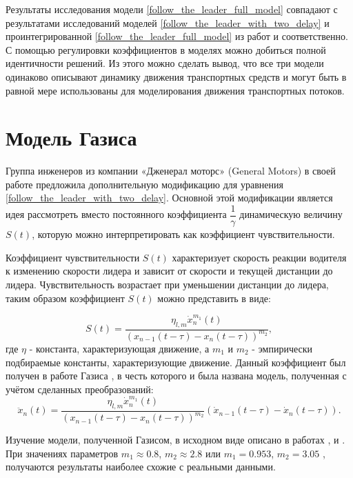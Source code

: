 \documentclass[12pt, a4paper]{extarticle}
\numberwithin{equation}{section}
\begin{document}
Результаты исследования модели \eqref{follow_the_leader_full_model} совпадают с  результатами исследований моделей \eqref{follow_the_leader_with_two_delay} и проинтегрированной \eqref{follow_the_leader_full_model} из работ \cite{RefineFirstFollowTheLeaderModel} и \cite{Course} соответственно. С помощью регулировки коэффициентов в моделях можно добиться полной идентичности решений. Из этого можно сделать вывод, что все три модели одинаково описывают динамику движения транспортных средств и могут быть в равной мере использованы для моделирования движения транспортных потоков.

\section{Модель Газиса}

Группа инженеров из компании «Дженерал моторс» (General Motors) в своей работе \cite{GazisModel} предложила дополнительную модификацию для уравнения  \eqref{follow_the_leader_with_two_delay}. Основной этой модификации является идея рассмотреть вместо постоянного коэффициента $\dfrac{1}{\gamma}$ динамическую величину $S(t)$, которую можно интерпретировать как коэффициент чувствительности. 

Коэффициент чувствительности $S(t)$ характеризует скорость реакции водителя к изменению скорости лидера и зависит от скорости и текущей дистанции до лидера. Чувствительность возрастает при уменьшении дистанции до лидера, таким образом коэффициент $S(t)$ можно представить в виде:

\begin{equation} \label{gazis_coefficient}
S(t) = \dfrac{\eta_{l,m}\dot{x}_n^{m_1}(t)}{(x_{n-1}(t-\tau)-x_n(t-\tau))^{m_2}},
\end{equation}
где $\eta$ - константа, характеризующая движение, а $m_1$ и $m_2$ - эмпирически подбираемые константы, характеризующие движение. Данный коэффициент был получен в работе Газиса \cite{GazisModel}, в честь которого и была названа модель, полученная с учётом сделанных преобразований:   
\begin{equation} \label{gazis_model}
\ddot{x}_n(t) = \dfrac{\eta_{l,m}\dot{x}_n^{m_1}(t)}{(x_{n-1}(t-\tau)-x_n(t-\tau))^{m_2}} (\dot{x}_{n-1}(t-\tau) - \dot{x}_{n}(t-\tau)).
\end{equation}

Изучение модели, полученной Газисом, в исходном виде описано в работах \cite{StudyingGazisModel_1},  \cite{StudyingGazisModel_2} и  \cite{StudyingGazisModel_3}. При значениях параметров $m_1 \approx 0.8$, $m_2 \approx 2.8$ \cite{StudyingGazisModel_1} или $m_1 = 0.953$, $m_2 = 3.05$ \cite{StudyingGazisModel_2}, \cite{StudyingGazisModel_3} получаются результаты наиболее схожие с реальными данными.
\end{document}

